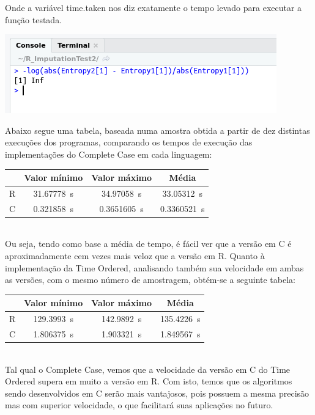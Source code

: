 \documentclass{article}
\begin{document}
Onde a variável time.taken nos diz exatamente o tempo levado para executar a função testada.

\includegraphics[width=0.80\columnwidth]{Code.png}

Abaixo segue uma tabela, baseada numa amostra obtida a partir de dez distintas execuções dos programas, comparando os tempos de execução das implementações do Complete Case em cada linguagem:\\


\begin{tabular}{|c|c|c|c|}
     \hline
      & Valor mínimo & Valor máximo & Média\\
      \hline
      R & \SI{31.67778}{\second} & \SI{34.97058}{\second} & \SI{33.05312}{\second}\\
      \hline
      C & \SI{0.321858}{\second} & \SI{0.3651605}{\second} & \SI{0.3360521}{\second}\\
      \hline
\end{tabular}\\


Ou seja, tendo como base a média de tempo, é fácil ver que a versão em C é aproximadamente cem vezes mais veloz que a versão em R.
Quanto à implementação da Time Ordered, analisando também sua velocidade em ambas as versões, com o mesmo número de amostragem, obtém-se a seguinte tabela:\\


\begin{tabular}{|c|c|c|c|}
     \hline
      & Valor mínimo & Valor máximo & Média\\
      \hline
      R & \SI{129.3993}{\second} & \SI{142.9892}{\second} & \SI{135.4226}{\second}\\
      \hline
      C & \SI{1.806375}{\second} & \SI{1.903321}{\second} & \SI{1.849567}{\second}\\
      \hline
\end{tabular}\\

Tal qual o Complete Case, vemos que a velocidade da versão em C do Time Ordered supera em muito a versão em R.
Com isto, temos que os algoritmos sendo desenvolvidos em C serão mais vantajosos, pois possuem a mesma precisão mas com superior velocidade, o que facilitará suas aplicações no futuro.
\end{document}
